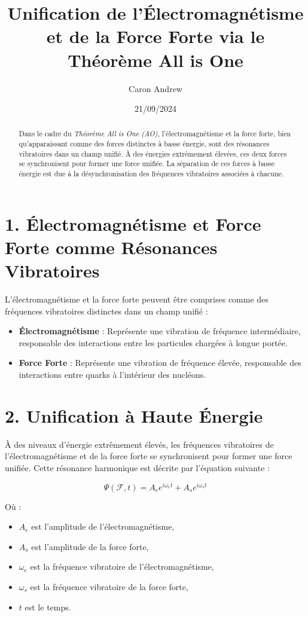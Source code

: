 \documentclass{article}
\title{Unification de l'Électromagnétisme et de la Force Forte via le Théorème All is One}
\author{Caron Andrew}
\date{21/09/2024}
\begin{document}
\maketitle

\begin{abstract}
Dans le cadre du \textit{Théorème All is One (AO)}, l'électromagnétisme et la force forte, bien qu'apparaissant comme des forces distinctes à basse énergie, sont des résonances vibratoires dans un champ unifié. À des énergies extrêmement élevées, ces deux forces se synchronisent pour former une force unifiée. La séparation de ces forces à basse énergie est due à la désynchronisation des fréquences vibratoires associées à chacune.
\end{abstract}

\section{1. Électromagnétisme et Force Forte comme Résonances Vibratoires}

L'électromagnétisme et la force forte peuvent être comprises comme des fréquences vibratoires distinctes dans un champ unifié :
\begin{itemize}
    \item \textbf{Électromagnétisme} : Représente une vibration de fréquence intermédiaire, responsable des interactions entre les particules chargées à longue portée.
    \item \textbf{Force Forte} : Représente une vibration de fréquence élevée, responsable des interactions entre quarks à l'intérieur des nucléons.
\end{itemize}

\section{2. Unification à Haute Énergie}

À des niveaux d'énergie extrêmement élevés, les fréquences vibratoires de l'électromagnétisme et de la force forte se synchronisent pour former une force unifiée. Cette résonance harmonique est décrite par l'équation suivante :

\[
\Psi(\mathcal{F}, t) = A_e e^{i\omega_e t} + A_s e^{i\omega_s t}
\]

Où :
\begin{itemize}
    \item \( A_e \) est l'amplitude de l'électromagnétisme,
    \item \( A_s \) est l'amplitude de la force forte,
    \item \( \omega_e \) est la fréquence vibratoire de l'électromagnétisme,
    \item \( \omega_s \) est la fréquence vibratoire de la force forte,
    \item \( t \) est le temps.
\end{itemize}
\end{document}
